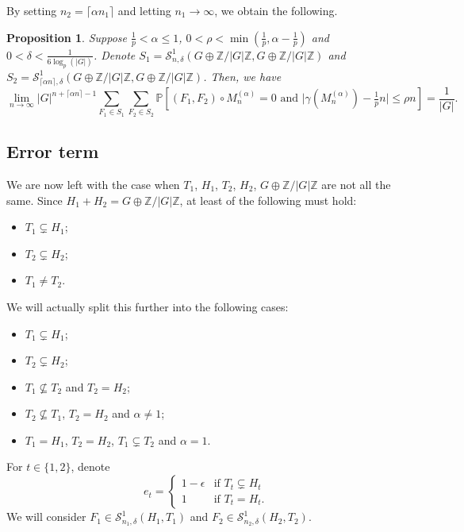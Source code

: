 \documentclass[12pt]{amsart}
\newtheorem{proposition}[theorem]{Proposition}
\theoremstyle{definition}
\newcommand{\PPP}{\mathbb{P}}
\newcommand{\SSO}[3]{\mathcal{S}^1_{#1}(#2,#3)}
\newcommand{\Mna}{M_{n}^{(\alpha)}}
\newcommand{\ZG}{\Z/\abs{G}\Z}
\newcommand{\abs}[1]{\vert#1\vert}
\newcommand{\Z}{\mathbb{Z}}
\newcommand{\ceil}[1]{\lceil#1\rceil}
\begin{document}
By setting $n_2=\ceil{\alpha n_1}$ and letting $n_1\to\infty$, we obtain the following.

\begin{proposition}\label{Prop: Laplacian main term}
Suppose $\frac{1}{p}<\alpha\leq 1$, $0<\rho<\min(\frac{1}{p},\alpha-\frac{1}{p})$ and $0<\delta<\frac{1}{6\log_p(\abs{G})}$.
Denote $S_1=\SSO{n,\delta}{G\oplus\ZG}{G\oplus\ZG}$ and $S_2=\SSO{\ceil{\alpha n},\delta}{G\oplus\ZG}{G\oplus\ZG}$.
Then, we have
\[
\lim_{n\to\infty} \abs{G}^{n+\ceil{\alpha n}-1}
\sum_{F_1\in S_1}
\sum_{F_2\in S_2}
\PPP[(F_1,F_2)\circ \Mna=0 \text{ and }
\abs{\gamma(\Mna) -\tfrac{1}{p} n}\leq \rho n] 
= \frac{1}{\abs{G}}.
\]
\end{proposition}











\subsection{Error term}

We are now left with the case when $T_1$, $H_1$, $T_2$, $H_2$, $G\oplus\ZG$ are not all the same.
Since $H_1+H_2=G\oplus\ZG$, at least of the following must hold:
\begin{itemize}
    \item $T_1\subsetneq H_1$;
    \item $T_2\subsetneq H_2$;
    \item $T_1\neq T_2$.
\end{itemize}
We will actually split this further into the following cases:
\begin{itemize}
    \item $T_1\subsetneq H_1$;
    \item $T_2\subsetneq H_2$;
    \item $T_1\not\subseteq T_2$ and $T_2=H_2$;
    \item $T_2\not\subseteq T_1$, $T_2=H_2$ and $\alpha\neq 1$;
    \item $T_1=H_1$, $T_2=H_2$, $T_1\subsetneq T_2$ and $\alpha=1$.
\end{itemize}
For $t\in\{1,2\}$, denote
\[
e_t
= \begin{cases}
    1-\epsilon &\text{if } T_t\subsetneq H_t\\
    1 &\text{if } T_t= H_t.
\end{cases}
\]
We will consider $F_1\in \SSO{n_1,\delta}{H_1}{T_1}$ and $F_2\in \SSO{n_2,\delta}{H_2}{T_2}$.
\end{document}
